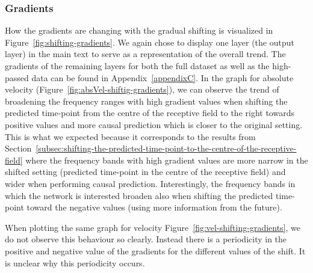 \subsubsection{Gradients}\label{subsubsec:across-shiftig-gradients}
How the gradients are changing with the gradual shifting is visualized in Figure~\ref{fig:shifting-gradients}. 
We again chose to display one layer (the output layer) in the main text to serve as a representation of the overall trend.
The gradients of the remaining layers for both the full dataset as well as the high-passed data can be found in Appendix~\ref{appendixC}.
In the graph for absolute velocity (Figure~\ref{fig:absVel-shiftig-gradients}), we can observe the trend of broadening the frequency ranges with high gradient values when shifting the predicted time-point from the centre of the receptive field to the right towards positive values and more causal prediction which is closer to the original setting.
This is what we expected because it corresponds to the results from Section~\ref{subsec:shifting-the-predicted-time-point-to-the-centre-of-the-receptive-field} where the frequency bands with high gradient values are more narrow in the shifted setting (predicted time-point in the centre of the receptive field) and wider when performing causal prediction.
Interestingly, the frequency bands in which the network is interested broaden also when shifting the predicted time-point toward the negative values (using more information from the future). 

When plotting the same graph for velocity Figure~\ref{fig:vel-shifting-gradients}, we do not observe this behaviour so clearly.
Instead there is a periodicity in the positive and negative value of the gradients for the different values of the shift.
It is unclear why this periodicity occurs.


